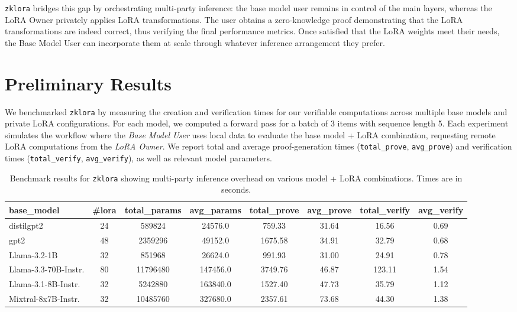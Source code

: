 \documentclass[11pt]{article}
\begin{document}
\texttt{zklora} bridges this gap by orchestrating multi-party inference: the base model user remains in control of the main layers, whereas the LoRA Owner privately applies LoRA transformations. The user obtains a zero-knowledge proof demonstrating that the LoRA transformations are indeed correct, thus verifying the final performance metrics. Once satisfied that the LoRA weights meet their needs, the Base Model User can incorporate them at scale through whatever inference arrangement they prefer.

\section{Preliminary Results}

We benchmarked \texttt{zklora} by measuring the creation and verification times for our verifiable computations across multiple base models and private LoRA configurations. For each model, we computed a forward pass for a batch of 3 items with sequence length 5. 
Each experiment simulates the workflow where the \emph{Base Model User} uses local data to evaluate the base model + LoRA combination, requesting remote LoRA computations from the \emph{LoRA Owner}. 
We report total and average proof-generation times (\texttt{total\_prove}, \texttt{avg\_prove}) and verification times (\texttt{total\_verify}, \texttt{avg\_verify}), as well as relevant model parameters.

\begin{table}[ht]
    \centering
    \small
    \begin{tabular}{l c c c c c c c}
    \toprule
    \textbf{base\_model} & \textbf{\#lora} & \textbf{total\_params} & \textbf{avg\_params} & \textbf{total\_prove} & \textbf{avg\_prove} & \textbf{total\_verify} & \textbf{avg\_verify} \\
    \midrule
distilgpt2 & 24 & 589824 & 24576.0 & 759.33 & 31.64 & 16.56 & 0.69 \\
gpt2 & 48 & 2359296 & 49152.0 & 1675.58 & 34.91 & 32.79 & 0.68 \\
Llama-3.2-1B & 32 & 851968 & 26624.0 & 991.93 & 31.00 & 24.91 & 0.78 \\
Llama-3.3-70B-Instr. & 80 & 11796480 & 147456.0 & 3749.76 & 46.87 & 123.11 & 1.54 \\
Llama-3.1-8B-Instr. & 32 & 5242880 & 163840.0 & 1527.40 & 47.73 & 35.79 & 1.12 \\
Mixtral-8x7B-Instr. & 32 & 10485760 & 327680.0 & 2357.61 & 73.68 & 44.30 & 1.38 \\
    \bottomrule
    \end{tabular}
    \caption{Benchmark results for \texttt{zklora} showing multi-party inference overhead on various model + LoRA combinations. Times are in seconds.}
    \label{tab:results}
\end{table}
\end{document}
